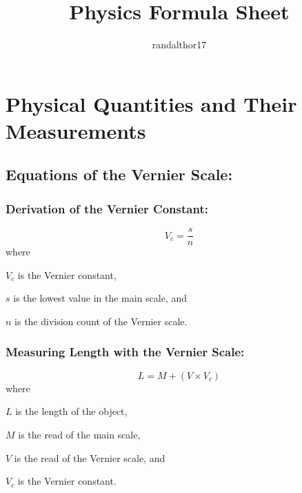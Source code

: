 \documentclass[a4paper]{report}
\title{Physics Formula Sheet}
\author{randalthor17 }
\begin{document}
\maketitle
\tableofcontents
\chapter{Physical Quantities and Their Measurements}
    \section{Equations of the Vernier Scale: }
        \subsection{Derivation of the Vernier Constant: }
            \begin{equation}
                V_c = \frac{s}{n}
            \end{equation}
            where 
            \begin{description}
                \item $V_c$ is the Vernier constant,
                \item $s$ is the lowest value in the main scale, and
                \item $n$ is the division count of the Vernier scale.
            \end{description}
        \subsection{Measuring Length with the Vernier Scale: }
            \begin{equation}
                L = M + (V \times V_c)
            \end{equation}
            where
            \begin{description}
                \item $L$ is the length of the object,
                \item $M$ is the read of the main scale,
                \item $V$ is the read of the Vernier scale, and
                \item $V_c$ is the Vernier constant.
            \end{description}
\end{document}
